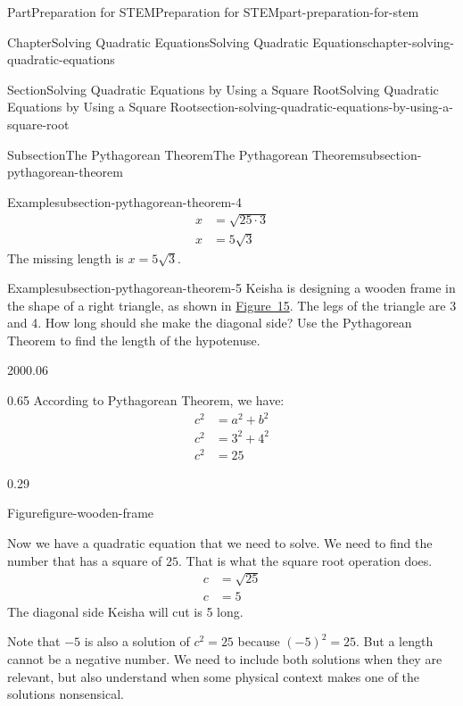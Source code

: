 \documentclass[twoside,10pt,]{book}
\numberwithin{equation}{section}
\newcommand{\amp}{&}
\begin{document}
\begin{partptx}{Part}{Preparation for STEM}{}{Preparation for STEM}{}{}{part-preparation-for-stem}
\begin{chapterptx}{Chapter}{Solving Quadratic Equations}{}{Solving Quadratic Equations}{}{}{chapter-solving-quadratic-equations}
\begin{sectionptx}{Section}{Solving Quadratic Equations by Using a Square Root}{}{Solving Quadratic Equations by Using a Square Root}{}{}{section-solving-quadratic-equations-by-using-a-square-root}
\begin{subsectionptx}{Subsection}{The Pythagorean Theorem}{}{The Pythagorean Theorem}{}{}{subsection-pythagorean-theorem}
\begin{example}{Example}{}{subsection-pythagorean-theorem-4}
{\begin{align*}
x\amp=\sqrt{25\cdot3}\\
x\amp=5\sqrt{3}
\end{align*}
The missing length is \(x=5\sqrt{3}\).%
}\end{example}
\begin{example}{Example}{}{subsection-pythagorean-theorem-5}%
Keisha is designing a wooden frame in the shape of a right triangle, as shown in \hyperref[figure-wooden-frame]{Figure~15}. The legs of the triangle are \SI{3}{\foot} and \SI{4}{\foot}. How long should she make the diagonal side? Use the Pythagorean Theorem to find the length of the hypotenuse.%
\begin{sidebyside}{2}{0}{0}{0.06}%
\begin{sbspanel}{0.65}%
According to Pythagorean Theorem, we have:%
\begin{align*}
c^2\amp=a^2+b^2\\
c^2\amp=3^2+4^2\\
c^2\amp=25
\end{align*}
%
\end{sbspanel}%
\begin{sbspanel}{0.29}%
\begin{panelfigureptx}{Figure}{}{figure-wooden-frame}{}%
%
\tcblower
\end{panelfigureptx}%
\end{sbspanel}%
\end{sidebyside}%
\par
Now we have a quadratic equation that we need to solve. We need to find the number that has a square of \(25\). That is what the square root operation does.%
\begin{align*}
c\amp=\sqrt{25}\\
c\amp=5
\end{align*}
The diagonal side Keisha will cut is \SI{5}{\foot} long.%
\par
Note that \(-5\) is also a solution of \(c^2=25\) because \((-5)^2=25\). But a length cannot be a negative number. We need to include both solutions when they are relevant, but also understand when some physical context makes one of the solutions nonsensical.%

\end{example}
\end{subsectionptx}
\end{sectionptx}
\end{chapterptx}
\end{partptx}
\end{document}

